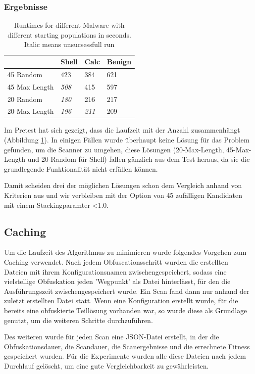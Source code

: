 \subsubsection{Ergebnisse}
\begin{table}[]
\begin{tabular}{@{}llll@{}}
\toprule
              & Shell        & Calc & Benign \\ \midrule
45 Random     & 423          & 384  & 621    \\
45 Max Length     & \textit{508} & 415  & 597    \\
20 Random     & \textit{180} & 216  & 217    \\
20 Max Length & \textit{196} & \textit{211}  & 209    \\ \bottomrule
\end{tabular}
\caption{Runtimes for different Malware with different starting populations in seconds. Italic means unsucsessfull run}
\label{Pretest_Inital}
\end{table}
Im Pretest hat sich gezeigt, dass die Laufzeit mit der Anzahl zusammenhängt (Abbildung \ref{Pretest_Inital}). In einigen Fällen wurde überhaupt keine Lösung für das Problem gefunden, um die Scanner zu umgehen, diese Lösungen (20-Max-Length, 45-Max-Length und 20-Random für Shell) fallen gänzlich aus dem Test heraus, da sie die grundlegende Funktionalität nicht erfüllen können.

Damit scheiden drei der möglichen Lösungen schon dem Vergleich anhand von Kriterien aus und wir verbleiben mit der Option von 45 zufälligen Kandidaten mit einem Stackingparamter <1.0.

\subsection{Caching}
\label{meth:caching}
Um die Laufzeit des Algorithmus zu minimieren wurde folgendes Vorgehen zum Caching verwendet. Nach jedem Obfuscationsschritt wurden die erstellten Dateien mit ihrem Konfigurationsnamen zwischengespeichert, sodass eine vielstellige Obfuskation jeden 'Wegpunkt' als Datei hinterlässt, für den die Ausführungszeit zwischengespeichert wurde. Ein Scan fand dann nur anhand der zuletzt erstellten Datei statt. Wenn eine Konfiguration erstellt wurde, für die bereits eine obfuskierte Teillösung vorhanden war, so wurde diese als Grundlage genutzt, um die weiteren Schritte durchzuführen. 

Des weiteren wurde für jeden Scan eine JSON-Datei erstellt, in der die Obfuskationsdauer, die Scandauer, die Scanergebnisse und die errechnete Fitness gespeichert wurden. Für die Experimente wurden alle diese Dateien nach jedem Durchlauf gelöscht, um eine gute Vergleichbarkeit zu gewährleisten.
